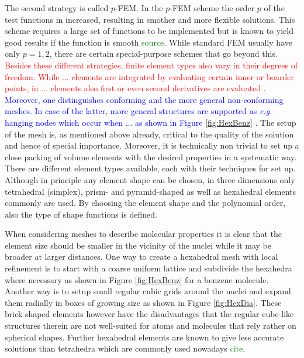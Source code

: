 The second strategy is called $p$-FEM. 
In the $p$-FEM scheme the order $p$ of the test functions in increased, resulting in smother and more flexible solutions.
This scheme requires a large set of functions to be implemented but is known to yield good results if the function is smooth \textcolor{green}{source}.
While standard FEM usually have only $p=1,2$, there are certain special-purpose schemes that go beyond this.
\textcolor{red}{Besides these different strategies, finite element types also vary in their degrees of freedom. While ... elements are integrated by evaluating certain inner or boarder points, in ... elements also first or even second derivatives are evaluated \cite{PSbook}.}
\textcolor{blue}{Moreover, one distinguishes conforming and the more general non-conforming meshes. In case of the latter, more general structures are supported as \textit{e.g.} hanging nodes which occur when ... as shown in Figure \ref{fig:HexBenz} \cite{PSbook}.}
The setup of the mesh is, as mentioned above already, critical to the quality of the solution and hence of special importance.
Moreover, it is technically non trivial to set up a close packing of volume elements with the desired properties in a systematic way.
There are different element types available, each with their techniques for set up.
Although in principle any element shape can be chosen, in three dimensions only tetrahedral (simplex), prism- and pyramid-shaped as well as hexahedral elements commonly are used.
By choosing the element shape and the polynomial order, also the type of shape functions is defined.

When considering meshes to describe molecular properties it is clear that the element size should be smaller in the vicinity of the nuclei while it may be broader at larger distances.
One way to create a hexahedral mesh with local refinement is to start with a coarse uniform lattice and subdivide the hexahedra where necessary as shown in Figure \ref{fig:HexBenz} for a benzene molecule.
Another way is to setup small regular cubic grids around the nuclei and expand them radially in boxes of growing size as shown in Figure \ref{fig:HexDia}.
These brick-shaped elements however have the disadvantages that the regular cube-like structures therein are not well-suited for atoms and molecules that rely rather on spherical shapes.
Further hexahedral elements are known to give less accurate solutions than tetrahedra which are commonly used nowadays \textcolor{green}{cite}.

